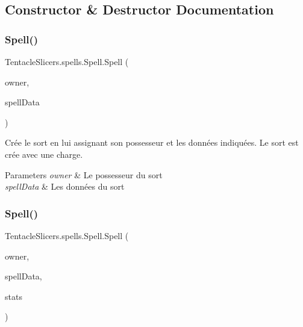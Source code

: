 \subsection{Constructor \& Destructor Documentation}
\mbox{\label{class_tentacle_slicers_1_1spells_1_1_spell_a25863b695362026f53baaadbc5654507}} 
\subsubsection{\texorpdfstring{Spell()}{Spell()}\hspace{0.1cm}{\footnotesize\ttfamily [1/2]}}
{\footnotesize\ttfamily Tentacle\+Slicers.\+spells.\+Spell.\+Spell (\begin{DoxyParamCaption}\item[{\hyperlink{class_tentacle_slicers_1_1actors_1_1_controlled_actor}{Controlled\+Actor}}]{owner,  }\item[{\hyperlink{class_tentacle_slicers_1_1spells_1_1_spell_data}{Spell\+Data}}]{spell\+Data }\end{DoxyParamCaption})}



Crée le sort en lui assignant son possesseur et les données indiquées. Le sort est crée avec une charge. 


\begin{DoxyParams}{Parameters}
{\em owner} & Le possesseur du sort \\
\hline
{\em spell\+Data} & Les données du sort \\
\hline
\end{DoxyParams}
\mbox{\label{class_tentacle_slicers_1_1spells_1_1_spell_a3ab5f2807146348c84b264ab16d664e0}} 
\subsubsection{\texorpdfstring{Spell()}{Spell()}\hspace{0.1cm}{\footnotesize\ttfamily [2/2]}}
{\footnotesize\ttfamily Tentacle\+Slicers.\+spells.\+Spell.\+Spell (\begin{DoxyParamCaption}\item[{\hyperlink{class_tentacle_slicers_1_1actors_1_1_controlled_actor}{Controlled\+Actor}}]{owner,  }\item[{\hyperlink{class_tentacle_slicers_1_1spells_1_1_spell_data}{Spell\+Data}}]{spell\+Data,  }\item[{\hyperlink{class_tentacle_slicers_1_1actors_1_1_player_stats}{Player\+Stats}}]{stats }\end{DoxyParamCaption})}



